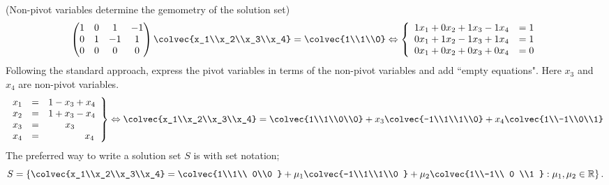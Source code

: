 \begin{example}\label{npcd} (Non-pivot variables determine the gemometry of the solution set)
\[\begin{pmatrix}
1 &  0 & 1 & -1 \\ 
 0 & 1 & -1& 1  \\
 0 &0   & 0  & 0 \\
\end{pmatrix}
\colvec{x_1\\x_2\\x_3\\x_4} 
=
\colvec{1\\1\\0} 
\Leftrightarrow
\left\{
\begin{array}{lcr}
	1x_1 +0x_2+ 1x_3 - 1x_4 & = 1 \\
	0x_1 +1x_2 - 1x_3 + 1x_4 & = 1 \\
	0x_1 +0x_2 + 0x_3 + 0x_4 & = 0 
\end{array}
     \right.
\]
Following the standard approach, express the pivot variables in terms of the non-pivot variables and add ``empty equations". Here $x_3$ and $x_4$ are non-pivot variables.  
\[
\left.
\begin{array}{rcl}
	x_1 & = &1 -x_3+x_4 \\
	x_2 & = &1 +x_3-x_4 \\
	x_3 & = &\phantom{1+~\,}x_3\\
	x_4 & =&\phantom{1+x_3+~}x_4         
\end{array}
     \right\}
     \Leftrightarrow
\colvec{x_1\\x_2\\x_3\\x_4} 
= \colvec{1\\1\\0\\0} + x_3\colvec{-1\\1\\1\\0} + x_4\colvec{1\\-1\\0\\1}
\]
The preferred way to write a solution set $S$ is with set notation;  \[S = \left\{\colvec{x_1\\x_2\\x_3\\x_4} = \colvec{1\\1\\ 0\\0 } + \mu_1 \colvec{-1\\1\\1\\0 }  + \mu_2  \colvec{1\\-1\\ 0 \\1 } : \mu_1,\mu_2\in  {\mathbb R} \right\} .\]

\end{example}
